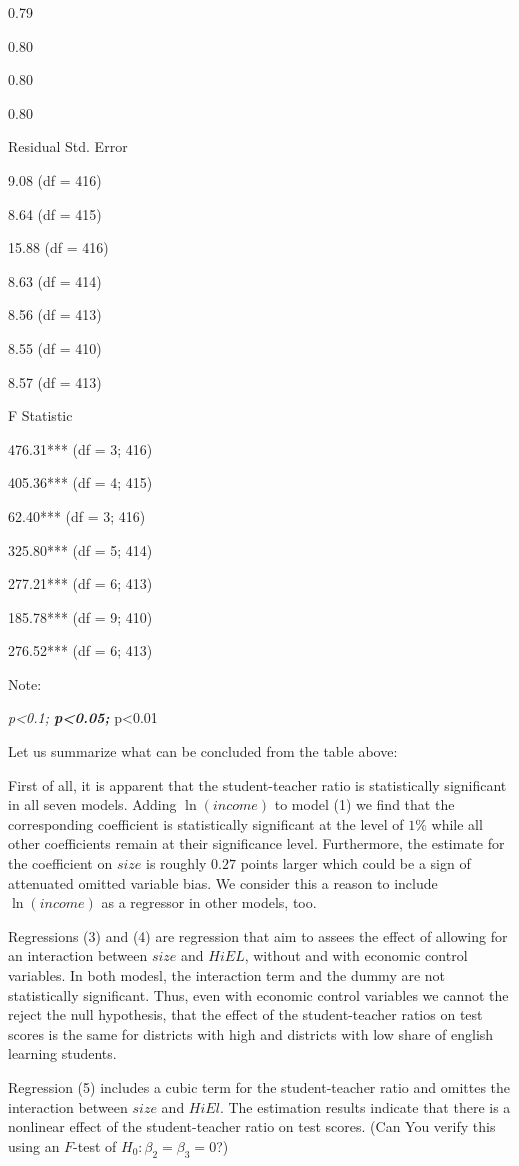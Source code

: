\documentclass[]{book}
\theoremstyle{definition}
\theoremstyle{definition}
\theoremstyle{definition}
\theoremstyle{remark}
\begin{document}
0.79

0.80

0.80

0.80

Residual Std. Error

9.08 (df = 416)

8.64 (df = 415)

15.88 (df = 416)

8.63 (df = 414)

8.56 (df = 413)

8.55 (df = 410)

8.57 (df = 413)

F Statistic

476.31*** (df = 3; 416)

405.36*** (df = 4; 415)

62.40*** (df = 3; 416)

325.80*** (df = 5; 414)

277.21*** (df = 6; 413)

185.78*** (df = 9; 410)

276.52*** (df = 6; 413)

Note:

\emph{p\textless{}0.1; \textbf{p\textless{}0.05; }}p\textless{}0.01

Let us summarize what can be concluded from the table above:

First of all, it is apparent that the student-teacher ratio is
statistically significant in all seven models. Adding \(\ln(income)\) to
model (1) we find that the corresponding coefficient is statistically
significant at the level of \(1\%\) while all other coefficients remain
at their significance level. Furthermore, the estimate for the
coefficient on \(size\) is roughly \(0.27\) points larger which could be
a sign of attenuated omitted variable bias. We consider this a reason to
include \(\ln(income)\) as a regressor in other models, too.

Regressions (3) and (4) are regression that aim to assees the effect of
allowing for an interaction between \(size\) and \(HiEL\), without and
with economic control variables. In both modesl, the interaction term
and the dummy are not statistically significant. Thus, even with
economic control variables we cannot the reject the null hypothesis,
that the effect of the student-teacher ratios on test scores is the same
for districts with high and districts with low share of english learning
students.

Regression (5) includes a cubic term for the student-teacher ratio and
omittes the interaction between \(size\) and \(HiEl\). The estimation
results indicate that there is a nonlinear effect of the student-teacher
ratio on test scores. (Can You verify this using an \(F\)-test of
\(H_0: \beta_2=\beta_3=0\)?)
\end{document}

